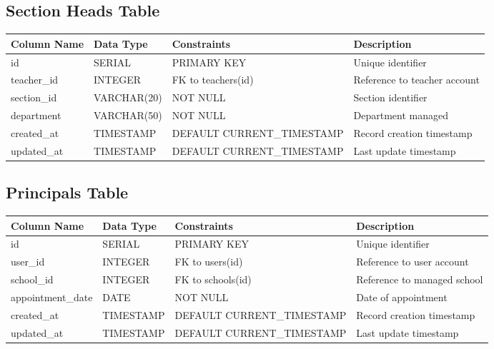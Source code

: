 \documentclass[11pt,a4paper]{article}
\begin{document}
\subsection{Section Heads Table}
\begin{longtable}{|p{3cm}|p{3cm}|p{2cm}|p{6cm}|}
\hline
\textbf{Column Name} & \textbf{Data Type} & \textbf{Constraints} & \textbf{Description} \\
\hline
\endhead
id & SERIAL & PRIMARY KEY & Unique identifier \\
\hline
teacher\_id & INTEGER & FK to teachers(id) & Reference to teacher account \\
\hline
section\_id & VARCHAR(20) & NOT NULL & Section identifier \\
\hline
department & VARCHAR(50) & NOT NULL & Department managed \\
\hline
created\_at & TIMESTAMP & DEFAULT CURRENT\_TIMESTAMP & Record creation timestamp \\
\hline
updated\_at & TIMESTAMP & DEFAULT CURRENT\_TIMESTAMP & Last update timestamp \\
\hline
\end{longtable}

\subsection{Principals Table}
\begin{longtable}{|p{3cm}|p{3cm}|p{2cm}|p{6cm}|}
\hline
\textbf{Column Name} & \textbf{Data Type} & \textbf{Constraints} & \textbf{Description} \\
\hline
\endhead
id & SERIAL & PRIMARY KEY & Unique identifier \\
\hline
user\_id & INTEGER & FK to users(id) & Reference to user account \\
\hline
school\_id & INTEGER & FK to schools(id) & Reference to managed school \\
\hline
appointment\_date & DATE & NOT NULL & Date of appointment \\
\hline
created\_at & TIMESTAMP & DEFAULT CURRENT\_TIMESTAMP & Record creation timestamp \\
\hline
updated\_at & TIMESTAMP & DEFAULT CURRENT\_TIMESTAMP & Last update timestamp \\
\hline
\end{longtable}
\end{document}
